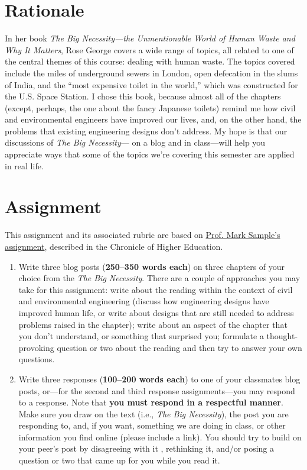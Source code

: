 \documentclass[12pt,letterpaper]{article}
\begin{document}
\section *{Rationale}
In her book \emph{The Big Necessity---the Unmentionable World of Human Waste and Why It Matters}, Rose George covers a wide range of topics, all related to one of the central themes of this course: dealing with human waste. The topics covered include the miles of underground sewers in London, open defecation in the slums of India, and the ``most expensive toilet in the world,'' which was constructed for the U.S. Space Station.  I chose this book, because almost all of the chapters (except, perhaps, the one about the fancy Japanese toilets) remind me how civil and environmental engineers have improved our lives, and, on the other hand, the problems that existing engineering designs don't address. My hope is that our discussions of \emph{The Big Necessity}--- on a blog and in class---will help you appreciate ways that some of the topics we're covering this semester are applied in real life.

\section *{Assignment} This assignment and its associated rubric are based on \href{http://chronicle.com/blogs/profhacker/a-rubric-for-evaluating-student-blogs/27196}{Prof. Mark Sample's assignment}, described in the Chronicle of Higher Education.
\begin{enumerate}
\item Write three blog posts (\textbf{250--350 words each}) on three chapters of your choice from the \emph{The Big Necessity}. There are a couple of approaches you may take for this assignment: write about the reading within the context of civil and environmental engineering (discuss how engineering designs have improved human life, or write about designs that are still needed to address problems raised in the chapter); write about an aspect of the chapter that you don't understand, or something that surprised you; formulate a thought-provoking question or two about the reading and then try to answer your own questions. 

\item Write three responses (\textbf{100--200 words each}) to one of your classmates blog posts, or---for the second and third response assignments---you may respond to a response. Note that \textbf{you must respond in a respectful manner}. Make sure you draw on the text (i.e., \emph{The Big Necessity}), the post you are responding to, and, if you want, something we are doing in class, or other information you find online (please include a link).   You should try to build on your peer's post by disagreeing with it , rethinking it, and/or posing a question or two that came up for you while you read it. 
\end{enumerate}
\end{document}
